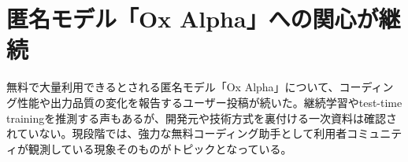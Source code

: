 \section{匿名モデル「Ox Alpha」への関心が継続}
無料で大量利用できるとされる匿名モデル「Ox Alpha」について、コーディング性能や出力品質の変化を報告するユーザー投稿が続いた。継続学習やtest-time trainingを推測する声もあるが、開発元や技術方式を裏付ける一次資料は確認されていない。現段階では、強力な無料コーディング助手として利用者コミュニティが観測している現象そのものがトピックとなっている。
